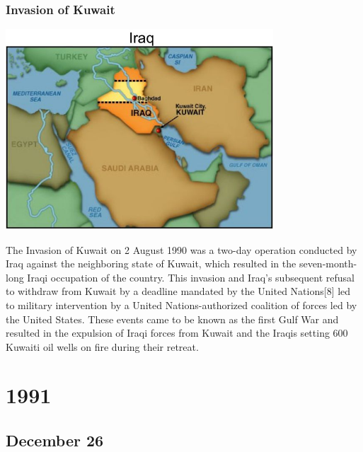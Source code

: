 \documentclass[11pt]{report}
\begin{document}
\subsection{Invasion of Kuwait}
\vspace{2mm}\begin{center}\includegraphics[width=10cm]{./img/iraqKuwaitWar.jpg}\end{center}
The Invasion of Kuwait on 2 August 1990 was a two-day operation conducted by Iraq against the neighboring state of Kuwait, which resulted in the seven-month-long Iraqi occupation of the country. This invasion and Iraq's subsequent refusal to withdraw from Kuwait by a deadline mandated by the United Nations[8] led to military intervention by a United Nations-authorized coalition of forces led by the United States. These events came to be known as the first Gulf War and resulted in the expulsion of Iraqi forces from Kuwait and the Iraqis setting 600 Kuwaiti oil wells on fire during their retreat.

\chapter{1991}
\section{December 26}
\end{document}
